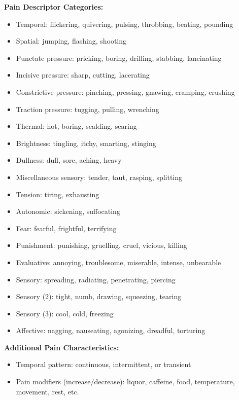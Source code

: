 \documentclass[preprint,12pt,authoryear]{elsarticle}
\begin{document}
{\begin{tcolorbox}
\textbf{Pain Descriptor Categories:}
\begin{itemize}[itemsep=1pt, parsep=1pt, topsep=1pt]
    \item Temporal: flickering, quivering, pulsing, throbbing, beating, pounding
    \item Spatial: jumping, flashing, shooting
    \item Punctate pressure: pricking, boring, drilling, stabbing, lancinating
    \item Incisive pressure: sharp, cutting, lacerating
    \item Constrictive pressure: pinching, pressing, gnawing, cramping, crushing
    \item Traction pressure: tugging, pulling, wrenching
    \item Thermal: hot, boring, scalding, searing
    \item Brightness: tingling, itchy, smarting, stinging
    \item Dullness: dull, sore, aching, heavy
    \item Miscellaneous sensory: tender, taut, rasping, splitting
    \item Tension: tiring, exhausting
    \item Autonomic: sickening, suffocating
    \item Fear: fearful, frightful, terrifying
    \item Punishment: punishing, gruelling, cruel, vicious, killing
    \item Evaluative: annoying, troublesome, miserable, intense, unbearable
    \item Sensory: spreading, radiating, penetrating, piercing
    \item Sensory (2): tight, numb, drawing, squeezing, tearing
    \item Sensory (3): cool, cold, freezing
    \item Affective: nagging, nauseating, agonizing, dreadful, torturing
\end{itemize}

\textbf{Additional Pain Characteristics:}
\begin{itemize}[itemsep=1pt, parsep=1pt, topsep=1pt]
    \item Temporal pattern: continuous, intermittent, or transient
    \item Pain modifiers (increase/decrease): liquor, caffeine, food, temperature, movement, rest, etc.
\end{itemize}


\end{tcolorbox}}
\end{document}
